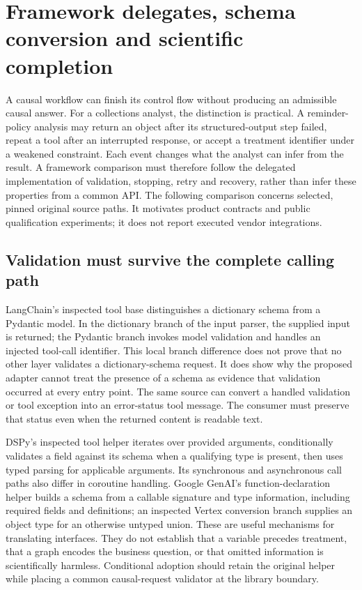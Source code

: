 \section[Framework delegates and scientific completion]{Framework delegates, schema conversion and scientific completion}
\label{sec:exec28-dl}
A causal workflow can finish its control flow without producing an admissible causal answer.
For a collections analyst, the distinction is practical. A reminder-policy analysis may return an
object after its structured-output step failed, repeat a tool after an interrupted response, or
accept a treatment identifier under a weakened constraint. Each event changes what the analyst can
infer from the result. A framework comparison must therefore follow the delegated implementation
of validation, stopping, retry and recovery, rather than infer these properties from a common API.
The following comparison concerns selected, pinned original source paths. It motivates product
contracts and public qualification experiments; it does not report executed vendor integrations.

\subsection{Validation must survive the complete calling path}
LangChain's inspected tool base distinguishes a dictionary schema from a Pydantic model. In the
dictionary branch of the input parser, the supplied input is returned; the Pydantic branch invokes
model validation and handles an injected tool-call identifier. This local branch difference does
not prove that no other layer validates a dictionary-schema request. It does show why the proposed
adapter cannot treat the presence of a schema as evidence that validation occurred at every entry
point. The same source can convert a handled validation or tool exception into an error-status tool
message. The consumer must preserve that status even when the returned content is readable text.
\citep{exec28_dl_langchain}

DSPy's inspected tool helper iterates over provided arguments, conditionally validates a field
against its schema when a qualifying type is present, then uses typed parsing for applicable
arguments. Its synchronous and asynchronous call paths also differ in coroutine handling. Google
GenAI's function-declaration helper builds a schema from a callable signature and type information,
including required fields and definitions; an inspected Vertex conversion branch supplies an
object type for an otherwise untyped union. These are useful mechanisms for translating interfaces.
They do not establish that a variable precedes treatment, that a graph encodes the business question,
or that omitted information is scientifically harmless. Conditional adoption should retain the
original helper while placing a common causal-request validator at the library boundary.
\citep{exec28_dl_dspy,exec28_dl_google}

